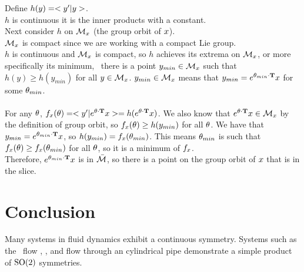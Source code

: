{Define $h(y)=<{y'}|y>$.\\
$h$ is continuous it is the inner products with a constant.\\
Next consider $h$ on ${\cal M}_{x}$ (the group orbit of $x$).\\
${\cal M}_{x}$ is compact since we are working with a compact Lie group.\\
$h$ is continuous and ${\cal M}_{x}$ is compact, so $h$ achieves its extrema on ${\cal M}_{x}$, or more specifically its minimum, \ie\ there is a point $y_{min} \in {\cal M}_{x}$ such that $h(y)\geq h(y_{min})$ for all $y\in {\cal M}_{x}$. $y_{min} \in {\cal M}_{x}$ means that $y_{min}=e^{{\bf \theta}_{min} \cdot \mathbf{T}} x$ for some ${\bf \theta}_{min}$.\\
\\
For any ${\bf \theta}$, $f_{x}({\bf \theta})=<{y'}|e^{{\bf \theta} \cdot \mathbf{T}} x>=h(e^{{\bf \theta} \cdot \mathbf{T}} x)$. We also know that $e^{{\bf \theta} \cdot \mathbf{T}} x \in {\cal M}_{x}$ by the definition of group orbit, so $f_{x}({\bf \theta})\geq h(y_{min})$ for all ${\bf \theta}$. We have that $y_{min}=e^{{\bf \theta}_{min} \cdot \mathbf{T}} x$, so $h(y_{min})=f_{x}({\bf \theta}_{min})$.
This means ${\bf \theta}_{min}$ is such that $f_{x}({\bf \theta})\geq f_{x}({\bf \theta}_{min})$ for all ${\bf \theta}$, so it is a minimum of $f_{x}$.\\
Therefore, $e^{{\bf \theta}_{min}\cdot \mathbf{T}} x$ is in $\bar{{\cal M}}$, so there is a point on the group orbit of $x$ that is in the slice.\\

	\fi

\section{Conclusion}

Many systems in fluid dynamics exhibit a continuous symmetry. Systems such as the \KS\ flow , {\pCf} , and flow through an cylindrical pipe  demonstrate a simple product of $\textrm{SO}(2)$ symmetries.

}
